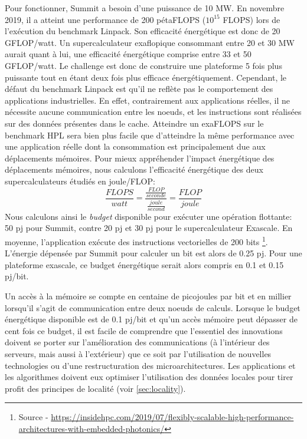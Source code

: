     
            Pour fonctionner, Summit a besoin d'une puissance de 10 MW. En novembre 2019, il a atteint une performance de 200 pétaFLOPS ($10^{15}$ \gls{FLOPS}) lors de l'exécution du benchmark Linpack. Son efficacité énergétique est donc de 20 GFLOP/watt. Un supercalculateur exaflopique consommant entre 20 et 30 MW aurait quant à lui, une efficacité énergétique comprise entre 33 et 50 GFLOP/watt. Le challenge est donc de construire une plateforme 5 fois plus puissante tout en étant deux fois plus efficace énergétiquement. Cependant, le défaut du benchmark Linpack est qu'il ne reflète pas le comportement des applications industrielles. En effet, contrairement aux applications réelles, il ne nécessite aucune communication entre les noeuds, et les instructions sont réalisées sur des données présentes dans le cache. Atteindre un exaFLOPS sur le benchmark HPL sera bien plus facile que d'atteindre la même performance avec une application réelle dont la consommation est principalement due aux déplacements mémoires. Pour mieux appréhender l'impact énergétique des déplacements mémoires, nous calculons l'efficacité énergétique des deux supercalculateurs étudiés en joule/FLOP:
            \begin{equation}
                 \frac{FLOPS}{watt}  =  \frac{\frac{FLOP}{seconde}}  { \frac{joule}{second}} =  \frac{FLOP}{joule}
            \end{equation}
            Nous calculons ainsi le \textit{budget} disponible pour exécuter une opération flottante: 50 pj pour Summit, contre 20 pj et 30 pj pour le supercalculateur Exascale. En moyenne, l'application exécute des instructions vectorielles de 200 bits \footnote{Source - \url{https://insidehpc.com/2019/07/flexibly-scalable-high-performance-architectures-with-embedded-photonics/}}. L'énergie dépensée par Summit pour calculer un bit est alors de 0.25 pj. Pour une plateforme exascale, ce budget énergétique serait alors compris en 0.1 et 0.15 pj/bit.
            
            Un accès à la mémoire se compte en centaine de picojoules par bit et en millier lorsqu'il s'agit de communication entre deux noeuds de calculs. Lorsque le budget énergétique disponible est de 0.1 pj/bit et qu'un accès mémoire peut dépasser de cent fois ce budget, il est facile de comprendre que l'essentiel des innovations doivent se porter sur l'amélioration des communications (à l'intérieur des serveurs, mais aussi à l'extérieur) que ce soit par l'utilisation de nouvelles technologies ou d'une restructuration des microarchitectures. Les applications et les algorithmes doivent eux optimiser l'utilisation des données locales pour tirer profit des principes de localité (voir \autoref{sec:locality}).

